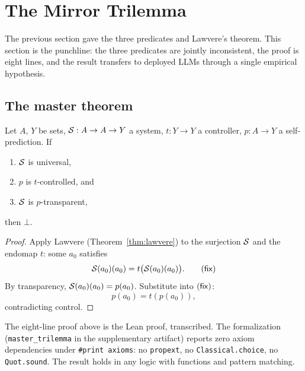 \section{The Mirror Trilemma}
\label{sec:mirror-trilemma}

The previous section gave the three predicates and Lawvere's theorem. This section is the punchline: the three predicates are jointly inconsistent, the proof is eight lines, and the result transfers to deployed LLMs through a single empirical hypothesis.

\subsection{The master theorem}
\label{sec:master}

\begin{theorem}
\label{thm:mirror-master}
Let $A$, $Y$ be sets, $\mathcal{S} : A \to A \to Y$ a system, $t : Y \to Y$ a controller, $p : A \to Y$ a self-prediction. If
\begin{enumerate}\itemsep1pt
  \item[\textup{(U)}] $\mathcal{S}$ is universal,
  \item[\textup{(C)}] $p$ is $t$-controlled, and
  \item[\textup{(T)}] $\mathcal{S}$ is $p$-transparent,
\end{enumerate}
then $\bot$.
\end{theorem}

\begin{proof}
Apply Lawvere (Theorem~\ref{thm:lawvere}) to the surjection $\mathcal{S}$ and the endomap $t$: some $a_0$ satisfies
\begin{equation}
\System(a_0)(a_0) = t\bigl(\System(a_0)(a_0)\bigr). \tag{$\fix$}
\end{equation}
By transparency, $\mathcal{S}(a_0)(a_0) = p(a_0)$. Substitute into $(\mathsf{fix})$:
\[
p(a_0) = t(p(a_0)),
\]
contradicting control.
\end{proof}

\begin{remark}
\label{rem:lean-master}
The eight-line proof above is the Lean proof, transcribed. The formalization (\texttt{master\_trilemma} in the supplementary artifact) reports zero axiom dependencies under \texttt{\#print axioms}: no \texttt{propext}, no \texttt{Classical.choice}, no \texttt{Quot.sound}. The result holds in any logic with functions and pattern matching.
\end{remark}

